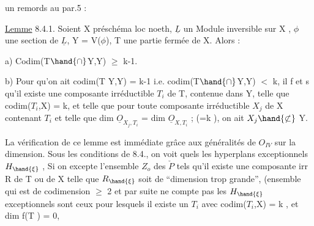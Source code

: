 un remords au par.5 :

\uline{Lemme} 8.4.1. Soient X préschéma loc noeth, $\underline{L}$ un Module inversible sur
X , $\phi$ une section de $\underline{L}$, Y = V($\phi$), T une partie fermée de X.  Alors :

a) Codim(T$\hand{\cap}$Y,Y) $\geq$ k-1.

b) Pour qu'on ait codim(T Y,Y) = k-1 i.e. codim(T$\hand{\cap}$Y,Y) $<$ k, il
f et s qu'il existe une composante irréductible $T_i$ de T, contenue dans
Y,  telle que codim($T_i$,X) = k, et telle que pour toute composante
irréductible $X_j$ de X  contenant $T_i$ et telle que dim $\underline{O}_{X_j,T_i}$ =
dim $\underline{O}_{X,T_i}$ ; (=k ), on ait $X_j \hand{\not\subset}$ Y.

La vérification de ce lemme est immédiate grâce aux généralités
de $O_{IV}$ sur la dimension. Sous les conditions de 8.4., on voit  quels 
les hyperplans exceptionnels $H_{\hand{\xi}}$ 
, Si
on excepte l'ensemble $Z_o$ des \hand{$\xi\in$} $\check{P}$ tels qu'il existe une composante
irr R de T ou de X telle  que $R_{\hand{\xi}}$ soit de ``dimension trop grande'',
 (ensemble qui est de codimension $\geq$ 2 et par suite ne compte pas
les $H_{\hand{\xi}}$  exceptionnels sont ceux pour lesquels il existe
un $T_i$ avec codim($T_i$,X) = k , et  dim f(T ) = 0,

